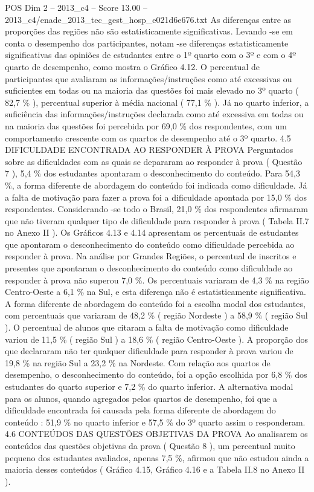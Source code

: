\begin{textsample}{POS Dim 2 – 2013\_c4 – Score 13.00 – 2013\_c4/enade\_2013\_tec\_gest\_hosp\_e021d6e676.txt}
As diferenças entre as proporções das regiões não são estatisticamente significativas.
Levando -se em conta o desempenho dos participantes, notam -se diferenças estatisticamente significativas das opiniões de estudantes entre o 1º quarto com o 3º e com o 4º quarto de desempenho, como mostra o Gráfico 4.12.
O percentual de participantes que avaliaram as informações/instruções como até excessivas ou suficientes em todas ou na maioria das questões foi mais elevado no 3º quarto ( 82,7 \% ), percentual superior à média nacional ( 77,1 \% ).
Já no quarto inferior, a suficiência das informações/instruções declarada como até excessiva em todas ou na maioria das questões foi percebida por 69,0 \% dos respondentes, com um comportamento crescente com os quartos de desempenho até o 3º quarto. 4.5 DIFICULDADE ENCONTRADA AO RESPONDER À PROVA Perguntados sobre as dificuldades com as quais se depararam ao responder à prova ( Questão 7 ), 5,4 \% dos estudantes apontaram o desconhecimento do conteúdo.
Para 54,3 \%, a forma diferente de abordagem do conteúdo foi indicada como dificuldade.
Já a falta de motivação para fazer a prova foi a dificuldade apontada por 15,0 \% dos respondentes.
Considerando -se todo o Brasil, 21,0 \% dos respondentes afirmaram que não tiveram qualquer tipo de dificuldade para responder à prova ( Tabela II.7 no Anexo II ).
Os Gráficos 4.13 e 4.14 apresentam os percentuais de estudantes que apontaram o desconhecimento do conteúdo como dificuldade percebida ao responder à prova.
Na análise por Grandes Regiões, o percentual de inscritos e presentes que apontaram o desconhecimento do conteúdo como dificuldade ao responder à prova não superou 7,0 \%.
Os percentuais variaram de 4,3 \% na região Centro-Oeste a 6,1 \% na Sul, e esta diferença não é estatisticamente significativa.
A forma diferente de abordagem do conteúdo foi a escolha modal dos estudantes, com percentuais que variaram de 48,2 \% ( região Nordeste ) a 58,9 \% ( região Sul ).
O percentual de alunos que citaram a falta de motivação como dificuldade variou de 11,5 \% ( região Sul ) a 18,6 \% ( região Centro-Oeste ).
A proporção dos que declararam não ter qualquer dificuldade para responder à prova variou de 19,8 \% na região Sul a 23,2 \% na Nordeste.
Com relação aos quartos de desempenho, o desconhecimento do conteúdo, foi a opção escolhida por 6,8 \% dos estudantes do quarto superior e 7,2 \% do quarto inferior.
A alternativa modal para os alunos, quando agregados pelos quartos de desempenho, foi que a dificuldade encontrada foi causada pela forma diferente de abordagem do conteúdo : 51,9 \% no quarto inferior e 57,5 \% do 3º quarto assim o responderam. 4.6 CONTEÚDOS DAS QUESTÕES OBJETIVAS DA PROVA Ao analisarem os conteúdos das questões objetivas da prova ( Questão 8 ), um percentual muito pequeno dos estudantes avaliados, apenas 7,5 \%, afirmou que não estudou ainda a maioria desses conteúdos ( Gráfico 4.15, Gráfico 4.16 e a Tabela II.8 no Anexo II ).

\end{textsample}
